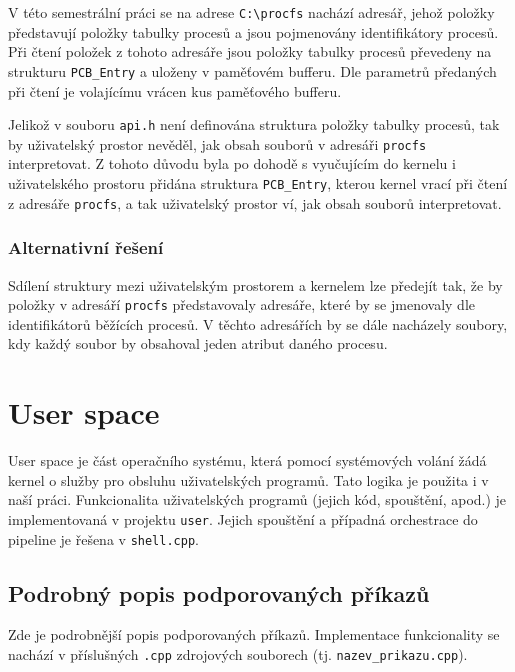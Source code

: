 \documentclass[12pt, a4paper]{article}
\let\oldsection\section
\renewcommand\section{\clearpage\oldsection}
\begin{document}
V této semestrální práci se na adrese \texttt{C:\textbackslash procfs} nachází adresář, jehož položky představují položky tabulky procesů a jsou pojmenovány identifikátory procesů. Při čtení položek z tohoto adresáře jsou položky tabulky procesů převedeny na strukturu \texttt{PCB\_Entry} a uloženy v paměťovém bufferu. Dle parametrů předaných při čtení je volajícímu vrácen kus paměťového bufferu.

Jelikož v souboru \texttt{api.h} není definována struktura položky tabulky procesů, tak by uživatelský prostor nevěděl, jak obsah souborů v adresáři \texttt{procfs} interpretovat. Z tohoto důvodu byla po dohodě s vyučujícím do kernelu i uživatelského prostoru přidána struktura \texttt{PCB\_Entry}, kterou kernel vrací při čtení z adresáře \texttt{procfs}, a tak uživatelský prostor ví, jak obsah souborů interpretovat.

\subsubsection{Alternativní řešení}
Sdílení struktury mezi uživatelským prostorem a kernelem lze předejít tak, že by položky v adresáří \texttt{procfs} představovaly adresáře, které by se jmenovaly dle identifikátorů běžících procesů. V těchto adresářích by se dále nacházely soubory, kdy každý soubor by obsahoval jeden atribut daného procesu.








\section{User space}
	User space je část operačního systému, která pomocí systémových volání žádá kernel o služby pro obsluhu uživatelských programů. Tato logika je použita i v naší práci. Funkcionalita uživatelských programů (jejich kód, spouštění, apod.) je implementovaná v projektu \texttt{user}. Jejich spouštění a případná orchestrace do pipeline je řešena v \texttt{shell.cpp}.
	
	
	\subsection{Podrobný popis podporovaných příkazů} \label{subDetail}
	Zde je podrobnější popis podporovaných příkazů. Implementace funkcionality se nachází v příslušných \texttt{.cpp} zdrojových souborech (tj. \texttt{nazev\_prikazu.cpp}).    
    
\end{document}
